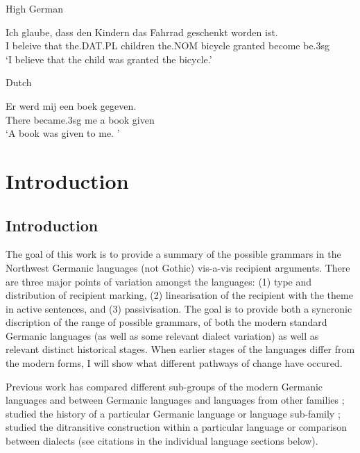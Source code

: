 \begin{exe}
\ex High German
\begin{xlist}
\ex \gll Ich glaube, dass den Kindern das Fahrrad geschenkt worden ist.\\
I beleive that the.DAT.PL children the.NOM bicycle granted become be.3sg\\
\trans `I believe that the child was granted the bicycle.'
\end{xlist}
\ex Dutch
\begin{xlist}
\ex \gll Er werd mij een boek gegeven.\\
There became.3sg me a book given\\
\trans `A book was given to me. \cite[pg 245]{Donaldson.2008}'
\end{xlist}
\end{exe}



\part{Introduction}
\chapter{Introduction}

The goal of this work is to provide a summary of the possible grammars in the Northwest Germanic languages (not Gothic) vis-a-vis recipient arguments. There are three major points of variation amongst the languages: (1) type and distribution of recipient marking, (2) linearisation of the recipient with the theme in active sentences, and (3) passivisation. The goal is to provide both a syncronic discription of the range of possible grammars, of both the modern standard Germanic languages (as well as some relevant dialect variation) as well as relevant distinct historical stages. When earlier stages of the languages differ from the modern forms, I will show what different pathways of change have occured. 

Previous work has compared different sub-groups of the modern Germanic languages and between Germanic languages and languages from other families \citep[and others]{Falk.1990, Holmberg.1995, Sprouse.1995, Weerman.1997, Holmberg.1998, Primus.1998, Anagnostopoulou.2003, McFadden.2004, Platzack.2005, Bardal.2006, Heine.2010, Alexiadou.2013, Johannessen.2013, Haddican.2014}; studied the history of a particular Germanic language or language sub-family \citep[and others]{Burridge.1993, Kristoffersen.1994, Kiparsky.1997, Allen.1999, Bardal.2001b, McFadden.2002, Hoskuldurrainsson.2004, Sigursson.2012}; studied the ditransitive construction within a particular language or comparison between dialects (see citations in the individual language sections below). 


